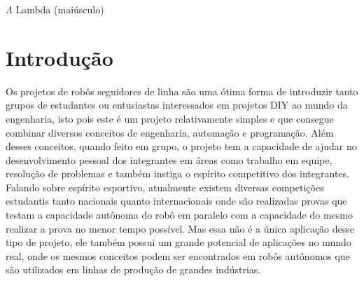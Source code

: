 \documentclass[
  12pt, %
  openright, %
  twoside, %
  a4paper, %
  english, %
  french, %
  spanish, %
  brazil %
]{abntex2}
\begin{document}
%
%
\begin{simbolos}
  \item[$ \Lambda $] Lambda (maiúsculo)
\end{simbolos}

%
%
\tableofcontents*
\cleardoublepage

\textual

\chapter{Introdução}

Os projetos de robôs seguidores de linha são uma ótima forma de introduzir tanto
grupos de estudantes ou entusiastas interessados em projetos DIY ao mundo da
engenharia, isto pois este é um projeto relativamente simples e que consegue
combinar diversos conceitos de engenharia, automação e programação. Além desses
conceitos, quando feito em grupo, o projeto tem a capacidade de ajudar no
desenvolvimento pessoal dos integrantes em áreas como trabalho em equipe,
resolução de problemas e também instiga o espírito competitivo dos integrantes.
Falando sobre espírito esportivo, atualmente existem diversas competições
estudantis tanto nacionais quanto internacionais onde são realizadas provas que
testam a capacidade autônoma do robô em paralelo com a capacidade do mesmo
realizar a prova no menor tempo possível. Mas essa não é a única aplicação desse
tipo de projeto, ele também possui um grande potencial de aplicações no mundo
real, onde os mesmos conceitos podem ser encontrados em robôs autônomos que são
utilizados em linhas de produção de grandes indústrias.

%
%
\postextual
\end{document}
